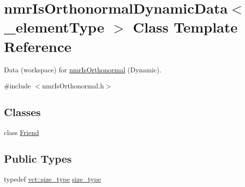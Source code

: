 \hypertarget{classnmr_is_orthonormal_dynamic_data}{\section{nmr\-Is\-Orthonormal\-Dynamic\-Data$<$ \-\_\-element\-Type $>$ Class Template Reference}
\label{classnmr_is_orthonormal_dynamic_data}
}


Data (workspace) for \hyperlink{nmr_is_orthonormal_8h_acf0ff1e2dbe0c988db04d9db1e2e7697}{nmr\-Is\-Orthonormal} (Dynamic).  




{\ttfamily \#include $<$nmr\-Is\-Orthonormal.\-h$>$}

\subsection*{Classes}
\begin{DoxyCompactItemize}
\item 
class \hyperlink{classnmr_is_orthonormal_dynamic_data_1_1_friend}{Friend}
\end{DoxyCompactItemize}
\subsection*{Public Types}
\begin{DoxyCompactItemize}
\item 
typedef \hyperlink{namespacevct_a3e2935e13aac4500965e00d30565775b}{vct\-::size\-\_\-type} \hyperlink{classnmr_is_orthonormal_dynamic_data_ae69581f9b270b49b1cd1d16ff29a5409}{size\-\_\-type}
\end{DoxyCompactItemize}
